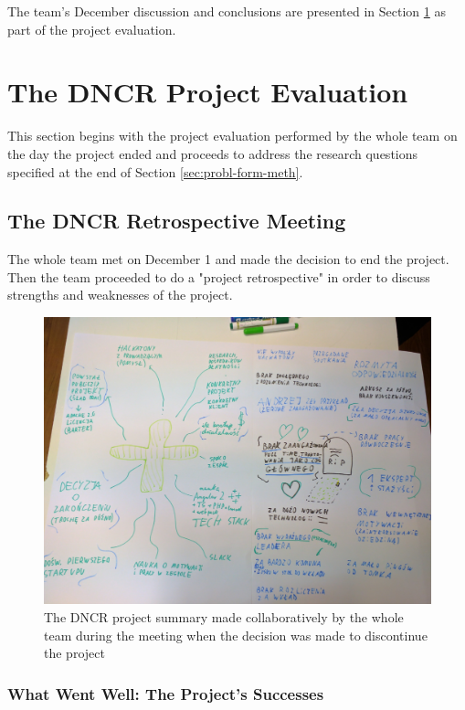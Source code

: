 \documentclass{article}
\begin{document}
The team's December discussion and conclusions are presented in Section \ref{sec:dncr-proj-eval} as part of the project evaluation.

\section{The DNCR Project Evaluation}
\label{sec:dncr-proj-eval}
This section begins with the project evaluation performed by the whole team on the day the project ended and proceeds to address the research questions specified at the end of Section \ref{sec:probl-form-meth}.

\subsection{The DNCR Retrospective Meeting}
The whole team met on December 1 and made the decision to end the project. Then the team proceeded to do a "project retrospective" in order to discuss strengths and weaknesses of the project.

\begin{figure}[h]
    \includegraphics[width=\textwidth]{dncr-funeral}
    \caption{The DNCR project summary made collaboratively by the whole team during the meeting when the decision was made to discontinue the project}
    \label{fig:dncr-funeral}
\end{figure}
\FloatBarrier

\subsubsection{What Went Well: The Project's Successes}
\end{document}
